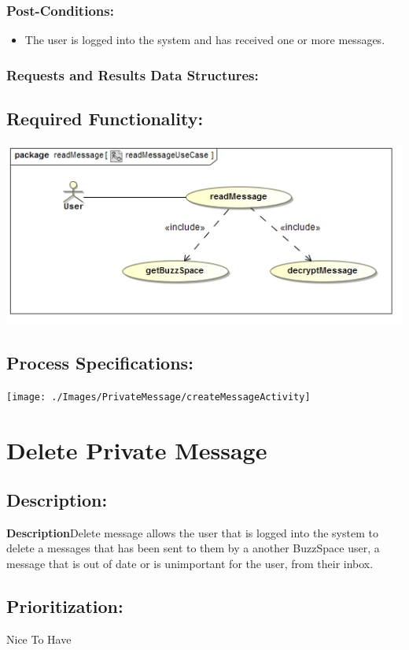 \documentclass[a4paper,11pt]{article}
\begin{document}
\subsubsection*{Post-Conditions:}
\begin{itemize}
\item The user is logged into the system and has received one or more messages.
\end{itemize}
\subsubsection*{Requests and Results Data Structures:}
\subsection{Required Functionality:} 
\includegraphics[width=1\linewidth]{./Images/PrivateMessage/readMessageUseCase}
\subsection{Process Specifications:} 
\texttt{[image: ./Images/PrivateMessage/createMessageActivity]}

\section{Delete Private Message}
\subsection*{Description:}
\textbf{Description}Delete message allows the user that is logged into the system to delete a messages that has been sent to them by a another BuzzSpace user, a message that is out of date or is unimportant for the user, from their inbox.
\subsection{Prioritization:} 
\textbf{}Nice To Have
\end{document}
